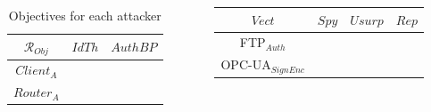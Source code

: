 \documentclass{beamer}
\newcommand{\ftpauth}{FTP$_{Auth}$\xspace}
\newcommand{\opcuasignenc}{OPC-UA$_{SignEnc}$\xspace}
\newcommand{\cmark}{{\color{green}\ding{51}}}%
\newcommand{\xmark}{}%
\begin{document}
\begin{frame}[fragile]{}
\begin{tcolorbox}[adjusted title={\centering\large Attack models}]
\begin{columns}[T]
\begin{column}{.65\textwidth}
\begin{tcolorbox}
                    \vspace{-.75em}
                    \begin{columns}[c]
                        \hspace{.1cm}
                        \begin{column}{.3\textwidth}
                            \begin{table}[htb]
                                \vspace{1.15em}
                                \centering
                                \begin{tabular}{|c|c|c|}
                                    \hline
                                    $\mathcal{R}_{Obj}$ & $IdTh$   & $AuthBP$    \\
                                    \hline
                                    $Client_{A}$        & \xmark    & \cmark     \\
                                    \hline
                                    $Router_{A}$        & \cmark    & \xmark     \\
                                    \hline
                                \end{tabular}
                                \caption{Objectives for each attacker}
                                \label{tab:ex_robj}
                            \end{table}
                        \end{column}
                        \begin{column}{.3\textwidth}
                            \begin{table}[htb]
                                \centering
                                \vspace{-.25em}
                                \begin{tabular}{|c|c|c|c|}
                                    \hline
                                    $Vect$          & $Spy$     & $Usurp$   & $Rep$     \\
                                    \hline
                                    \ftpauth        & \cmark    & \xmark    & \cmark    \\
                                    \hline
                                    \opcuasignenc   & \xmark    & \xmark    & \xmark    \\
                                    \hline
                                \end{tabular}

\end{table}
\end{column}
\end{columns}
\end{tcolorbox}
\end{column}
\end{columns}
\end{tcolorbox}
\end{frame}
\end{document}
